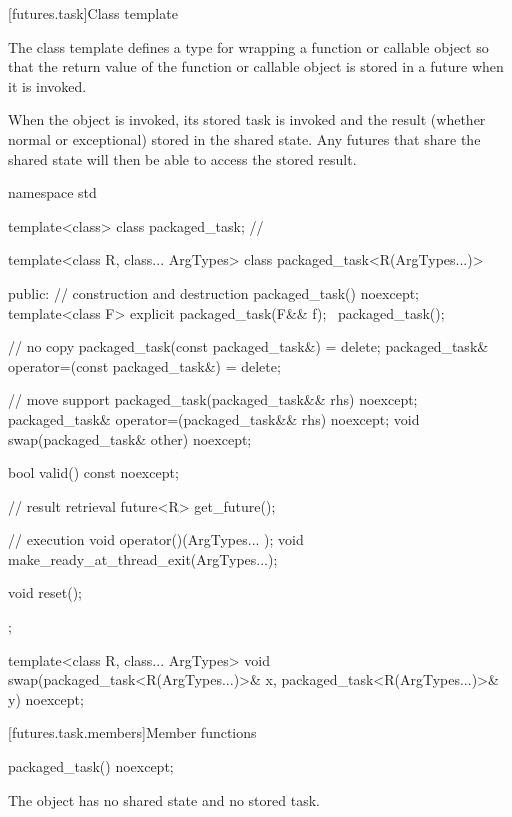 [futures.task]{Class template }

\pnum
The class template  defines a type for wrapping a function or
callable object so that the return value of the function or callable object is stored in
a future when it is invoked.

\pnum
When the  object is invoked, its stored task is invoked and the
result (whether normal or exceptional) stored in the shared state. Any futures that
share the shared state will then be able to access the stored result.

%
\begin{codeblock}
namespace std {
  template<class> class packaged_task;  // \notdef

  template<class R, class... ArgTypes>
  class packaged_task<R(ArgTypes...)> {
  public:
    // construction and destruction
    packaged_task() noexcept;
    template<class F>
      explicit packaged_task(F&& f);
    ~packaged_task();

    // no copy
    packaged_task(const packaged_task&) = delete;
    packaged_task& operator=(const packaged_task&) = delete;

    // move support
    packaged_task(packaged_task&& rhs) noexcept;
    packaged_task& operator=(packaged_task&& rhs) noexcept;
    void swap(packaged_task& other) noexcept;

    bool valid() const noexcept;

    // result retrieval
    future<R> get_future();

    // execution
    void operator()(ArgTypes... );
    void make_ready_at_thread_exit(ArgTypes...);

    void reset();
  };

  template<class R, class... ArgTypes>
    void swap(packaged_task<R(ArgTypes...)>& x, packaged_task<R(ArgTypes...)>& y) noexcept;
}
\end{codeblock}

[futures.task.members]{Member functions}

%
\begin{itemdecl}
packaged_task() noexcept;
\end{itemdecl}

\begin{itemdescr}
\pnum
\effects
The object has no shared state and no stored task.
\end{itemdescr}

